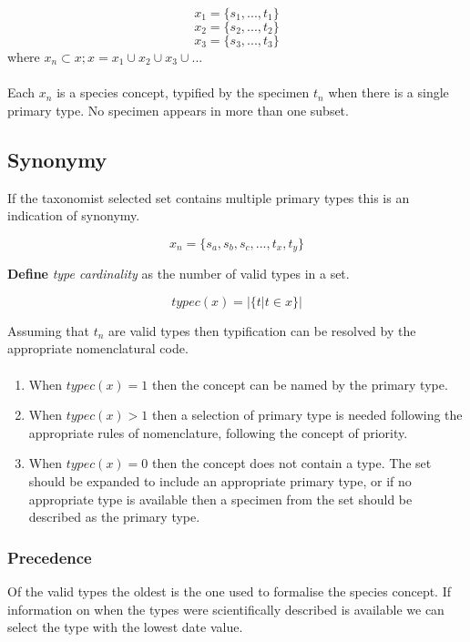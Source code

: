 \documentclass{article}
\begin{document}
   \[x_1 = \{s_1, ..., t_1\}\]
   \[x_2 = \{s_2, ..., t_2\}\]
   \[x_3 = \{s_3, ..., t_3\}\]
   where $x_n \subset x; x= x_1 \cup x_2 \cup x_3 \cup ...$
   
   \paragraph{}
   Each $x_n$ is a species concept, typified by the specimen $t_n$ when there is a single primary type. No specimen appears in more than one subset.
   
   \subsection{Synonymy}
   If the taxonomist selected set contains multiple primary types this is an indication of synonymy.
   
   \[x_n = \{s_a, s_b, s_c, ..., t_x, t_y\}\]
   
   \textbf{Define} \textit{type cardinality} as the number of valid types in a set.
   
   \[typec(x) = \left|\{t|t \in x\}\right| \]
   
   Assuming that $t_n$ are valid types then typification can be resolved by the appropriate nomenclatural code.
   \paragraph{}
   \begin{enumerate}
   \item When $typec(x) = 1$ then the concept can be named by the primary type.
   \item When $typec(x) > 1$ then a selection of primary type is needed following the appropriate rules of nomenclature, following the concept of priority.
   \item When $typec(x) = 0$ then the concept does not contain a type. The set should be expanded to include an appropriate primary type, or if no appropriate type is available then a specimen from the set should be described as the primary type.
   \end{enumerate}
   
   \subsubsection{Precedence}
   Of the valid types the oldest is the one used to formalise the species concept. If information on when the types were scientifically described is available we can select the type with the lowest date value.
\end{document}
